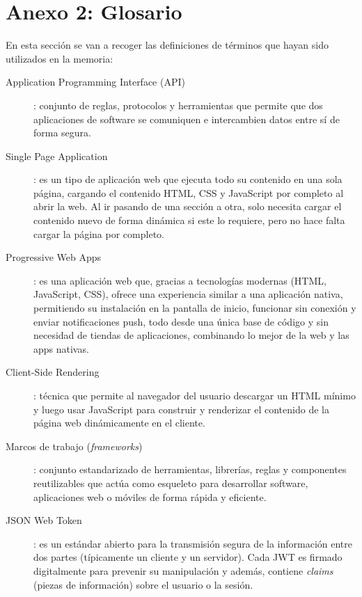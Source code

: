 \chapter*{Anexo 2: Glosario}

En esta sección se van a recoger las definiciones de términos que hayan sido utilizados en la memoria:

\begin{description}
    \item[\hypertarget{api}{Application Programming Interface (API)}]: conjunto de reglas, protocolos y herramientas 
    que permite que dos aplicaciones de software se comuniquen e intercambien datos entre sí de forma segura.
    
    \item[\hypertarget{singlePageApplication}{Single Page Application}]: es un tipo de aplicación web que ejecuta todo 
    su contenido en una sola página, cargando el contenido HTML, CSS y JavaScript por completo al abrir la web. Al ir
    pasando de una sección a otra, solo necesita cargar el contenido nuevo de forma dinámica si este lo requiere, 
    pero no hace falta cargar la página por completo.

    \item[\hypertarget{progressiveWebApps}{Progressive Web Apps}]: es una aplicación web que, gracias a tecnologías 
    modernas (HTML, JavaScript, CSS), ofrece una experiencia similar a una aplicación nativa, permitiendo su 
    instalación en la pantalla de inicio, funcionar sin conexión y enviar notificaciones push, todo desde una única 
    base de código y sin necesidad de tiendas de aplicaciones, combinando lo mejor de la web y las apps nativas. 

    \item[\hypertarget{clientSideRendering}{Client-Side Rendering}]: técnica que permite al navegador del usuario 
    descargar un HTML mínimo y luego usar JavaScript para construir y renderizar el contenido de la página web 
    dinámicamente en el cliente.

    \item[\hypertarget{marcosTrabajo}{Marcos de trabajo (\textit{frameworks})}]: conjunto estandarizado de herramientas, 
    librerías, reglas y componentes reutilizables que actúa como esqueleto para desarrollar software, aplicaciones web 
    o móviles de forma rápida y eficiente.

    \item[\hypertarget{jwt}{JSON Web Token}]: es un estándar abierto para la transmisión segura de la información entre dos partes 
    (típicamente un cliente y un servidor). Cada JWT es firmado digitalmente para prevenir su manipulación y además, contiene 
    \textit{claims} (piezas de información) sobre el usuario o la sesión.


\end{description}
